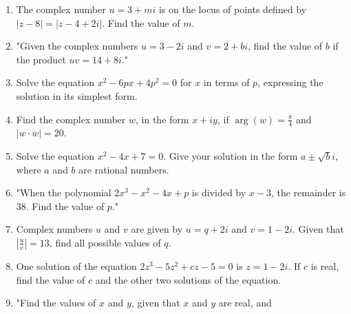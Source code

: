 \documentclass{article}
\begin{document}
\begin{enumerate}
\vspace{3cm}
\item The complex number \( u = 3 + mi \) is on the locus of points defined by \( |z - 8| = |z - 4 + 2i| \). Find the value of \( m \).
\vspace{3cm}
\item "Given the complex numbers \( u = 3 - 2i \) and \( v = 2 + bi \), find the value of \( b \) if the product \( uv = 14 + 8i \)."
\vspace{3cm}
\item Solve the equation \( x^2 - 6px + 4p^2 = 0 \) for \( x \) in terms of \( p \), expressing the solution in its simplest form.
\vspace{3cm}
\item Find the complex number \( w \), in the form \( x + iy \), if \(\arg(w) = \frac{\pi}{4}\) and \(|w \cdot \overline{w}| = 20\).
\vspace{3cm}
\item Solve the equation \(x^2 - 4x + 7 = 0\). Give your solution in the form \(a \pm \sqrt{b}i\), where \(a\) and \(b\) are rational numbers.
\vspace{3cm}
\item "When the polynomial \(2x^3 - x^2 - 4x + p\) is divided by \(x - 3\), the remainder is 38. Find the value of \(p\)."
\vspace{3cm}
\item Complex numbers \(u\) and \(v\) are given by \(u = q + 2i\) and \(v = 1 - 2i\). Given that \(\left| \frac{u}{v} \right| = 13\), find all possible values of \(q\).
\vspace{3cm}
\item One solution of the equation \(2z^3 - 5z^2 + cz - 5 = 0\) is \(z = 1 - 2i\). If \(c\) is real, find the value of \(c\) and the other two solutions of the equation.
\vspace{3cm}
\item "Find the values of \( x \) and \( y \), given that \( x \) and \( y \) are real, and


\end{enumerate}
\end{document}
